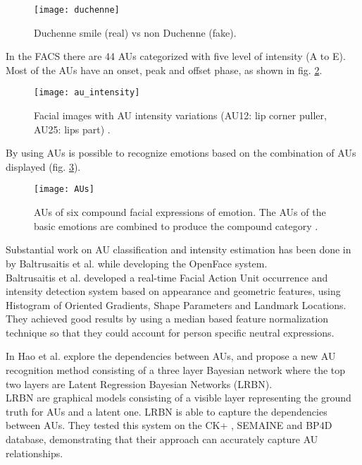 \begin{figure}[H]
	\centering
	\texttt{[image: duchenne]}
	\caption{Duchenne smile (real) vs non Duchenne (fake).}
	\label{fig:duchenne}
\end{figure}

In the FACS there are 44 AUs categorized with five level of intensity (A to E). Most of the AUs have an onset, peak and offset phase, as shown in fig. \ref{fig:au_intensity}. 

\begin{figure}[H]
	\centering
	\texttt{[image: au\_intensity]}
	\caption{Facial images with AU intensity variations (AU12: lip corner puller, AU25: lips part) \cite{DISFA}.}
	\label{fig:au_intensity}
\end{figure}

By using AUs is possible to recognize emotions based on the combination of AUs displayed (fig. \ref{fig:AUs}).

\begin{figure}[H]
	\centering
	\texttt{[image: AUs]}
	\caption{AUs of six compound facial expressions of emotion. The AUs of the basic emotions are combined to produce the compound category \cite{Du2014CompoundFE}.}
	\label{fig:AUs}
\end{figure}

Substantial work on AU classification and intensity estimation has been done in \cite{Baltru2015} by Baltrusaitis et al. while developing the OpenFace \cite{Baltru2016} system. \\
Baltrusaitis et al. developed a real-time Facial Action Unit occurrence and intensity detection system based on appearance and geometric features, using Histogram of Oriented Gradients, Shape Parameters and Landmark Locations. They achieved good results by using a median based feature normalization technique so that they could account for person specific neutral expressions.


In \cite{HaoWangAU} Hao et al. explore the dependencies between AUs, and propose a new AU recognition method consisting of a three layer Bayesian network where the top two layers are Latent Regression Bayesian Networks (LRBN). \\
LRBN are graphical models consisting of a visible layer representing the ground truth for AUs and a latent one. LRBN is able to capture the dependencies between AUs. They tested this system on the CK+ \cite{CK+}, SEMAINE \cite{SEMAINE} and BP4D \cite{BP4D-Spontaneous} database, demonstrating that their approach can accurately capture AU relationships.

